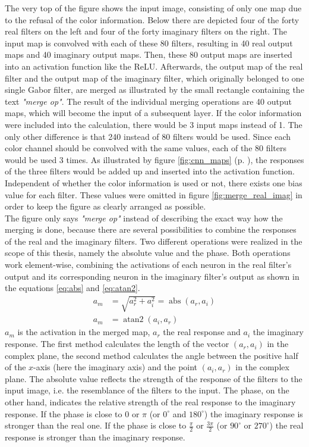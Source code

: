 \documentclass[11pt, a4paper]{article}
\newcommand\q[1]{\emph{"#1"}}
\newcommand\myref[1]{\ref{#1} (p. \pageref{#1})}
\begin{document}


The very top of the figure shows the input image, consisting of only one map due to the refusal of the color information. Below there are depicted four of the forty real filters on the left and four of the forty imaginary filters on the right. The input map is convolved with each of these 80 filters, resulting in 40 real output maps and 40 imaginary output maps. Then, these 80 output maps are inserted into an activation function like the \ac{ReLU}. Afterwards, the output map of the real filter and the output map of the imaginary filter, which originally belonged to one single Gabor filter, are merged as illustrated by the small rectangle containing the text \q{merge op}. The result of the individual merging operations are 40 output maps, which will become the input of a subsequent layer. If the color information were included into the calculation, there would be 3 input maps instead of 1. The only other difference is that 240 instead of 80 filters would be used. Since each color channel should be convolved with the same values, each of the 80 filters would be used 3 times. As illustrated by figure \myref{fig:cnn_maps}, the responses of the three filters would be added up and inserted into the activation function. Independent of whether the color information is used or not, there exists one bias value for each filter. These values were omitted in figure \ref{fig:merge_real_imag} in order to keep the figure as clearly arranged as possible.\\
The figure only says \q{merge op} instead of describing the exact way how the merging is done, because there are several possibilities to combine the responses of the real and the imaginary filters. Two different operations were realized in the scope of this thesis, namely the absolute value and the phase. Both operations work element-wise, combining the activations of each neuron in the real filter's output and its corresponding neuron in the imaginary filter's output as shown in the equations \eqref{eq:abs} and \eqref{eq:atan2}.
\begin{align}
\label{eq:abs}
a_m &= \sqrt{a_r^2 + a_i^2} = \operatorname{abs}(a_r, a_i)\\
\label{eq:atan2}
a_m &= \operatorname{atan2}(a_i, a_r)
\end{align}
$a_m$ is the activation in the merged map, $a_r$ the real response and $a_i$ the imaginary response. The first method calculates the length of the vector $(a_r,a_i)$ in the complex plane, the second method calculates the angle between the positive half of the $x$-axis (here the imaginary axis) and the point $(a_i,a_r)$ in the complex plane. The absolute value reflects the strength of the response of the filters to the input image, i.e. the resemblance of the filters to the input. The phase, on the other hand, indicates the relative strength of the real response to the imaginary response. If the phase is close to $0$ or $\pi$ (or $0^\circ$ and $180^\circ$) the imaginary response is stronger than the real one. If the phase is close to $\frac{\pi}{2}$ or $\frac{3\pi}{2}$ (or $90^\circ$ or $270^\circ$) the real response is stronger than the imaginary response.\\
\end{document}
